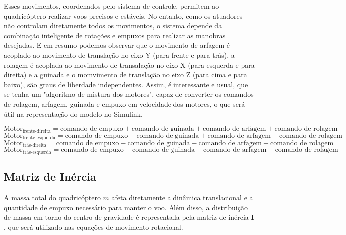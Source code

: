Esses movimentos, coordenados pelo sistema de controle, permitem ao quadricóptero realizar voos precisos e estáveis. No entanto, como os atuadores não controlam diretamente todos os movimentos, o sistema depende da combinação inteligente de rotações e empuxos para realizar as manobras desejadas. E em resumo podemos observar que o movimento de arfagem é acoplado ao movimento de translação no eixo Y (para frente e para trás), a rolagem é acoplada ao movimento de transalação no eixo X (para esquerda e para direita) e a guinada e o momvimento de translação no eixo Z (para cima e para baixo), são graus de liberdade independentes.
Assim, é interessante e usual, que se tenha um "algoritmo de mistura dos motores", capaz de converter os comandos de rolagem, arfagem, guinada e empuxo em velocidade dos motores, o que será útil na representação do modelo no Simulink.

\begin{equation}
	\text{Motor}_{\text{frente-direita}} = \text{comando de empuxo} + \text{comando de guinada} + \text{comando de arfagem} + \text{comando de rolagem}
\end{equation}
\begin{equation}
	\text{Motor}_{\text{frente-esquerda}} = \text{comando de empuxo} - \text{comando de guinada} + \text{comando de arfagem} - \text{comando de rolagem}
\end{equation}
\begin{equation}
	\text{Motor}_{\text{trás-direita}} = \text{comando de empuxo} - \text{comando de guinada} - \text{comando de arfagem} + \text{comando de rolagem}
\end{equation}
\begin{equation}
	\text{Motor}_{\text{trás-esquerda}} = \text{comando de empuxo} + \text{comando de guinada} - \text{comando de arfagem} - \text{comando de rolagem}
\end{equation}






\subsection{Matriz de Inércia}

A massa total do quadricóptero \( m \) afeta diretamente a dinâmica translacional e a quantidade de empuxo necessário para manter o voo. Além disso, a distribuição de massa em torno do centro de gravidade é representada pela matriz de inércia \( \boldsymbol{I} \), que será utilizado nas equações de movimento rotacional.

